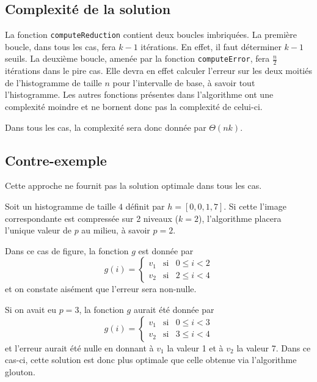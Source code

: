 \documentclass[a4paper, 12pt]{article}
\begin{document}
	\subsection{Complexité de la solution}
	\label{subsec:subsec_Q3b}
	La fonction \texttt{computeReduction} contient deux boucles imbriquées. La première boucle, dans tous les cas, fera \(k-1\) itérations. En effet, il faut déterminer \(k-1\) seuils. La deuxième boucle, amenée par la fonction \texttt{computeError}, fera \(\frac{n}{2}\) itérations dans le pire cas. Elle devra en effet calculer l'erreur sur les deux moitiés de l'histogramme de taille \(n\) pour l'intervalle de base, à savoir tout l'histogramme. Les autres fonctions présentes dans l'algorithme ont une complexité moindre et ne bornent donc pas la complexité de celui-ci.\par
	Dans tous les cas, la complexité sera donc donnée par \(\Theta\left(nk\right)\).
	
	\subsection{Contre-exemple}
	Cette approche ne fournit pas la solution optimale dans tous les cas.\par
	Soit un histogramme de taille \(4\) définit par \(h=\left[0,0,1,7\right]\). Si cette l'image correspondante est compressée sur 2 niveaux (\(k = 2\)), l'algorithme placera l'unique valeur de \(p\) au milieu, à savoir \(p = 2\).\par
	Dans ce cas de figure, la fonction \(g\) est donnée par
	\begin{displaymath}
	    g\left ( i \right ) =
        \left\{\begin{matrix}
        v_1 & \text{si}  & 0\leq i<2\\ 
        v_2 & \text{si} & 2\leq i<4
        \end{matrix}\right.
    \end{displaymath}
    et on constate aisément que l'erreur sera non-nulle.\par
    Si on avait eu \(p = 3\), la fonction \(g\) aurait été donnée par
    \begin{displaymath}
	    g\left ( i \right ) =
        \left\{\begin{matrix}
        v_1 & \text{si}  & 0\leq i<3\\ 
        v_2 & \text{si} & 3\leq i<4
        \end{matrix}\right.
    \end{displaymath}
    et l'erreur aurait été nulle en donnant à $v_1$ la valeur 1 et à $v_2$ la valeur 7. Dans ce cas-ci, cette solution est donc plus optimale que celle obtenue via l'algorithme glouton.
	
\end{document}
